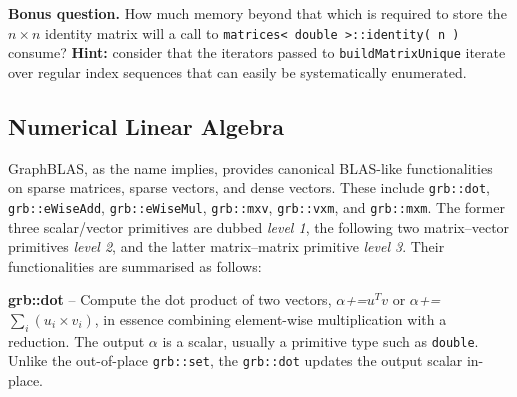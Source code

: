 \noindent \textbf{Bonus question.} How much memory beyond that which is required to store the $n\times n$ identity matrix will a call to \texttt{matrices< double >::identity( n )} consume? \textbf{Hint:} consider that the iterators passed to \texttt{buildMatrixUnique} iterate over regular index sequences that can easily be systematically enumerated.

\subsection{Numerical Linear Algebra}

GraphBLAS, as the name implies, provides canonical BLAS-like functionalities on sparse matrices, sparse vectors, and dense vectors. These include \texttt{grb::dot}, \texttt{grb::eWiseAdd}, \texttt{grb::eWiseMul}, \texttt{grb::mxv}, \texttt{grb::vxm}, and \texttt{grb::mxm}. The former three scalar/vector primitives are dubbed \emph{level 1}, the following two matrix--vector primitives \emph{level 2}, and the latter matrix--matrix primitive \emph{level 3}. Their functionalities are summarised as follows:\newline
 
      \textbf{grb::dot} – Compute the dot product of two vectors, $\alpha$\textit{+=}$u^Tv$ or $\alpha$\textit{+=}$\sum_i (u_i \times v_i)$, in essence combining element-wise multiplication with a reduction. The output $\alpha$ is a scalar, usually a primitive type such as \texttt{double}. Unlike the out-of-place \texttt{grb::set}, the \texttt{grb::dot} updates the output scalar in-place.\newline

